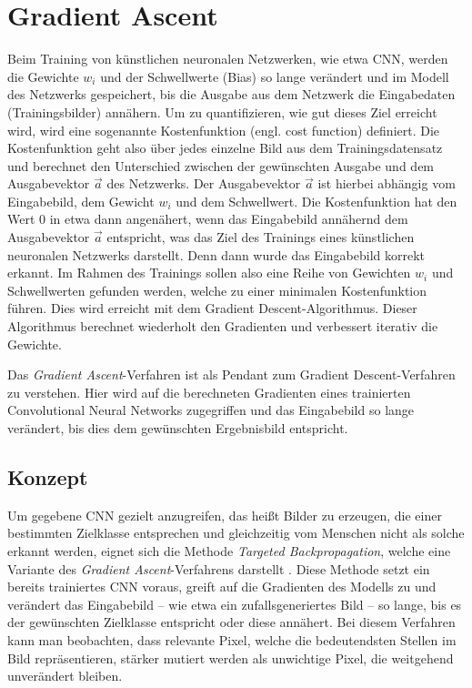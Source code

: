 \chapter{Gradient Ascent}
\label{cha:gascent}

Beim Training von künstlichen neuronalen Netzwerken, wie etwa \ac{CNN}, werden die Gewichte $ w_{i} $ und der Schwellwerte (Bias) so lange verändert und im Modell des Netzwerks gespeichert, bis die Ausgabe aus dem Netzwerk die Eingabedaten (Trainingsbilder) annähern. 
Um zu quantifizieren, wie gut dieses Ziel erreicht wird, wird eine sogenannte Kostenfunktion (engl. cost function) definiert. 
Die Kostenfunktion geht also über jedes einzelne Bild aus dem Trainingsdatensatz und berechnet den Unterschied zwischen der gewünschten Ausgabe und dem Ausgabevektor $\vec{a}$ des Netzwerks.
Der Ausgabevektor $\vec{a}$ ist hierbei abhängig vom Eingabebild, dem Gewicht $w_{i}$ und dem Schwellwert.
Die Kostenfunktion hat den Wert 0 in etwa dann angenähert, wenn das Eingabebild annähernd dem Ausgabevektor $\vec{a}$ entspricht, was das Ziel des Trainings eines künstlichen neuronalen Netzwerks darstellt. Denn dann wurde das Eingabebild korrekt erkannt.
Im Rahmen des Trainings sollen also eine Reihe von Gewichten $w_{i}$ und Schwellwerten gefunden werden, welche zu einer minimalen Kostenfunktion führen. 
Dies wird erreicht mit dem Gradient Descent-Algorithmus\cite{zhou_understanding_2018}.
Dieser Algorithmus berechnet wiederholt den Gradienten und verbessert iterativ die Gewichte. 


Das \textit{Gradient Ascent}-Verfahren ist als Pendant zum Gradient Descent-Verfahren zu verstehen. Hier wird auf die berechneten Gradienten eines trainierten Convolutional Neural Networks zugegriffen und das Eingabebild so lange verändert, bis dies dem gewünschten Ergebnisbild entspricht.
\section{Konzept}
Um gegebene \ac{CNN} gezielt anzugreifen, das heißt Bilder zu erzeugen, die einer bestimmten Zielklasse entsprechen und gleichzeitig vom Menschen nicht als solche erkannt werden, eignet sich die Methode \textit{Targeted Backpropagation}, welche eine Variante des \textit{Gradient Ascent}-Verfahrens darstellt \cite{liu_delving_2016}.
Diese Methode setzt ein bereits trainiertes \ac{CNN} voraus, greift auf die Gradienten des Modells zu und verändert das Eingabebild – wie etwa ein zufallsgeneriertes Bild – so lange, bis es der gewünschten Zielklasse entspricht oder diese annähert. 
Bei diesem Verfahren kann man beobachten, dass relevante Pixel, welche die bedeutendsten Stellen im Bild repräsentieren, stärker mutiert werden als unwichtige Pixel, die weitgehend unverändert bleiben.
